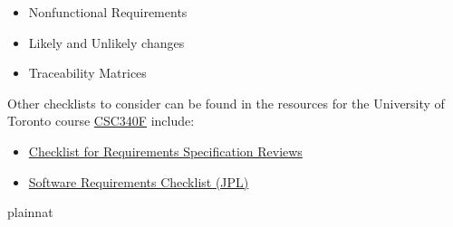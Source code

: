 \documentclass[12pt]{article}
\begin{document}
\begin{itemize}
  \item Nonfunctional Requirements

  \item Likely and Unlikely changes

  \item Traceability Matrices

\end{itemize}

Other checklists to consider can be found in the resources for the University of
Toronto course
\href{https://www.cs.toronto.edu/~sme/CSC340F/2005/assignments/inspections/}
{CSC340F} include:

\begin{itemize}
  \item
    \href{https://www.cs.toronto.edu/~sme/CSC340F/2005/assignments/inspections/reqts_checklist.pdf}
    {Checklist for Requirements Specification Reviews}
  \item
    \href{https://www.cs.toronto.edu/~sme/CSC340F/2005/assignments/inspections/JPL_reqts_clist.pdf}
    {Software Requirements Checklist (JPL)}
\end{itemize}

 {plainnat}

\end{document}
